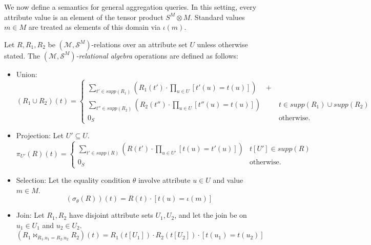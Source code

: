 \documentclass[oneside, 11pt]{amsbook}
\theoremstyle{plain}
\theoremstyle{definition}
\theoremstyle{remark}
\begin{document}
We now define a semantics for general aggregation queries. In this setting, every attribute value is an element of the tensor product $S^M \otimes M$. Standard values $m \in M$ are treated as elements of this domain via $\iota(m)$.

\begin{defn}
    Let $R, R_1, R_2$ be $(\mathcal{M}, \mathcal{S}^M)$-relations over an attribute set $U$ unless otherwise stated. The \emph{$(\mathcal{M}, \mathcal{S}^M)$-relational algebra} operations are defined as follows:
    \begin{itemize}
        \item Union:
              \[
                  (R_1 \cup R_2)(t) =
                  \begin{cases}
                      \sum\limits_{t' \in supp(R_1)} \left( R_1(t') \cdot \prod\limits_{u \in U} [t'(u) = t(u)] \right) \quad  + &                                \\
                      \sum\limits_{t'' \in supp(R_2)} \left( R_2(t'') \cdot \prod\limits_{u \in U} [t''(u) = t(u)] \right)       & t \in supp(R_1) \cup supp(R_2) \\
                      0_S                                                                                                        & \text{otherwise.}
                  \end{cases}
              \]
        \item Projection: Let $U' \subseteq U$.
              \[
                  \pi_{U'}(R)(t) =
                  \begin{cases}
                      \sum\limits_{t' \in supp(R)} \left( R(t') \cdot \prod\limits_{u \in U'} [t(u) = t'(u)] \right) & t[U'] \in supp(R) \\
                      0_S                                                                                            & \text{otherwise.}
                  \end{cases}
              \]
        \item Selection: Let the equality condition $\theta$ involve attribute $u \in U$ and value $m \in M$.
              \[
                  (\sigma_\theta(R))(t) = R(t) \cdot [t(u) = \iota(m)]
              \]
        \item Join: Let $R_1, R_2$ have disjoint attribute sets $U_1, U_2$, and let the join be on $u_1 \in U_1$ and $u_2 \in U_2$.
              \[
                  (R_1 \bowtie_{R_1.u_1 = R_2.u_2} R_2)(t) = R_1(t[U_1]) \cdot R_2(t[U_2]) \cdot [t(u_1) = t(u_2)]
\]
\end{itemize}
\end{defn}
\end{document}
